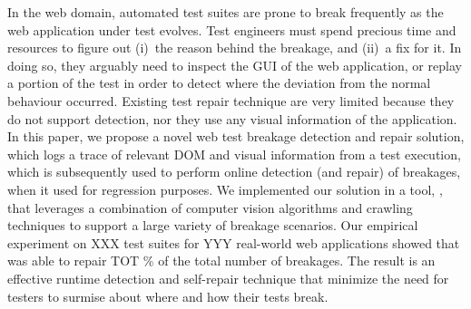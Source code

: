 In the web domain, automated test suites are prone to break frequently as the web application under test evolves. Test engineers must spend precious time and resources to figure out (i)~the reason behind the breakage, and (ii)~a fix for it. In doing so, they arguably need to inspect the GUI of the web application, or replay a portion of the test in order to detect where the deviation from the normal behaviour occurred. 
Existing test repair technique are very limited because they do not support detection, nor they use any visual information of the application.
In this paper, we propose a novel web test breakage detection and repair solution, which logs a trace of relevant DOM and visual information from a test execution, which is subsequently used to perform online detection (and repair) of breakages, when it used for regression purposes. We implemented our solution in a tool, \tool, that leverages a combination of computer vision algorithms and crawling  techniques to support a large variety of breakage scenarios. Our empirical experiment on XXX test suites for YYY real-world web applications showed that \tool was able to repair TOT \% of the total number of breakages. The result is an effective runtime detection and self-repair technique that minimize the need for testers to surmise about where and how their tests break.